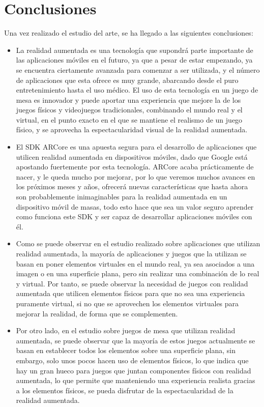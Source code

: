 \section{Conclusiones}
Una vez realizado el estudio del arte, se ha llegado a las siguientes conclusiones:
\begin{itemize}
  \item La realidad aumentada es una tecnología que supondrá parte importante de las aplicaciones móviles en el futuro, ya que a pesar de estar empezando, ya se encuentra ciertamente avanzada para comenzar a ser utilizada, y el número de aplicaciones que esta ofrece es muy grande, abarcando desde el puro entretenimiento hasta el uso médico. El uso de esta tecnología en un juego de mesa es innovador y puede aportar una experiencia que mejore la de los juegos físicos y videojuegos tradicionales, combinando el mundo real y el virtual, en el punto exacto en el que se mantiene el realismo de un juego físico, y se aprovecha la espectacularidad visual de la realidad aumentada.

  \item El SDK ARCore es una apuesta segura para el desarrollo de aplicaciones que utilicen realidad aumentada en dispositivos móviles, dado que Google está apostando fuertemente por esta tecnología. ARCore acaba prácticamente de nacer, y le queda mucho por mejorar, por lo que veremos muchos avances en los próximos meses y años, ofrecerá nuevas características que hasta ahora son probablemente inimaginables para la realidad aumentada en un dispositivo móvil de masas, todo esto hace que sea un valor seguro aprender como funciona este SDK y ser capaz de desarrollar aplicaciones móviles con él.

  \item Como se puede observar en el estudio realizado sobre aplicaciones que utilizan realidad aumentada, la mayoría de aplicaciones y juegos que la utilizan se basan en poner elementos virtuales en el mundo real, ya sea asociados a una imagen o en una superficie plana, pero sin realizar una combinación de lo real y virtual. Por tanto, se puede observar la necesidad de juegos con realidad aumentada que utilicen elementos físicos para que no sea una experiencia puramente virtual, si no que se aprovechen los elementos virtuales para mejorar la realidad, de forma que se complementen.

  \item Por otro lado, en el estudio sobre juegos de mesa que utilizan realidad aumentada, se puede observar que la mayoría de estos juegos actualmente se basan en establecer todos los elementos sobre una superficie plana, sin embargo, solo unos pocos hacen uso de elementos físicos, lo que indica que hay un gran hueco para juegos que juntan componentes físicos con realidad aumentada, lo que permite que manteniendo una experiencia realista gracias a los elementos físicos, se pueda disfrutar de la espectacularidad de la realidad aumentada.


\end{itemize}
